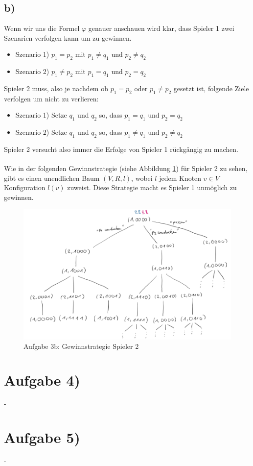 \documentclass[12pt]{article}
\begin{document}
\subsection*{b)}
Wenn wir uns die Formel $\varphi$ genauer anschauen wird klar, dass Spieler 1 zwei Szenarien verfolgen kann um zu gewinnen.
%
\begin{itemize}
  \item Szenario 1) $p_1 = p_2$ mit $p_1 \neq q_1$ und $p_2 \neq q_2$
  \item Szenario 2) $p_1 \neq p_2$ mit $p_1 = q_1$ und $p_2 = q_2$
\end{itemize}
%
Spieler 2 muss, also je nachdem ob $p_1 = p_2$ oder $p_1 \neq p_2$ gesetzt ist, folgende Ziele verfolgen um nicht zu verlieren:
%
\begin{itemize}
  \item Szenario 1) Setze $q_1$ und $q_2$ so, dass $p_1 = q_1$ und $p_2 = q_2$
  \item Szenario 2) Setze $q_1$ und $q_2$ so, dass $p_1 \neq q_1$ und $p_2 \neq q_2$
\end{itemize}
%
Spieler 2 versucht also immer die Erfolge von Spieler 1 rückgängig zu machen.\\
\\
Wie in der folgenden Gewinnstrategie (siehe Abbildung \ref{aufgabe3b}) für Spieler 2 zu sehen, gibt es einen unendlichen Baum $(V,R,l)$, wobei $l$ jedem Knoten $v \in V$ Konfiguration $l(v)$ zuweist. Diese Strategie macht es Spieler 1 unmöglich zu gewinnen.
\begin{figure}[htbp]
\centering
\includegraphics[width=\textwidth]{aufgabe3_gewinnstrategie.png}
\caption{Aufgabe 3b: Gewinnstrategie Spieler 2 }
\label{aufgabe3b}
\end{figure}


\section*{Aufgabe 4)}
-

\section*{Aufgabe 5)}
-
\end{document}
